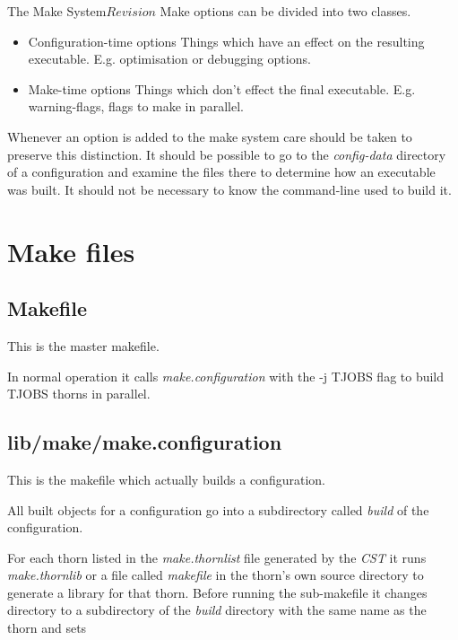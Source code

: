 \begin{cactuspart}{3}{The Make System}{}{$Revision$}
Make options can be divided into two classes.

\begin{itemize}
\item{Configuration-time options}
Things which have an effect on the resulting executable. 
E.g. optimisation or debugging options.
\item{Make-time options}
Things which don't effect the final executable.
E.g. warning-flags, flags to make in parallel.
\end{itemize}

Whenever an option is added to the make system care should be taken
to preserve this distinction.  It should be possible to go to the
{\em config-data} directory of a configuration and examine the files
there to determine how an executable was built.  It should not be
necessary to know the command-line used to build it.


\chapter{Make files}
\label{ch:makefiles}

\section{Makefile}
\label{sec:makefiles:Makefile}

This is the master makefile.  

In normal operation it calls {\em make.configuration} with the
-j TJOBS flag to build TJOBS thorns in parallel.

\section{lib/make/make.configuration}
\label{sec:makefiles:configuration}

This is the makefile which actually builds a configuration.

All built objects for a configuration go into a subdirectory called
{\em build} of the configuration.

For each thorn listed in the {\em make.thornlist} file generated
by the {\em CST} it runs {\em make.thornlib} or a file called {\em makefile} 
in the thorn's own source directory to generate a library for
that thorn.  Before running the sub-makefile it changes directory to a subdirectory
of the {\em build} directory with the same name as the thorn and sets


\end{cactuspart}
